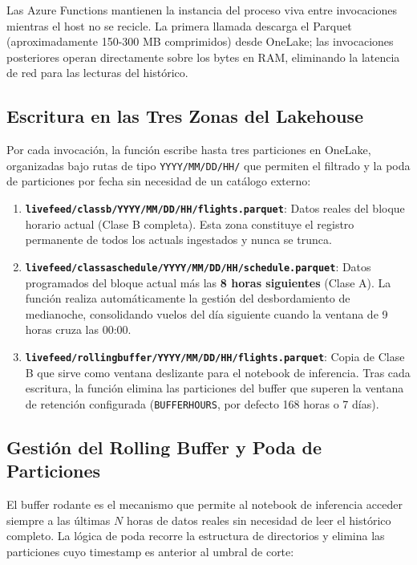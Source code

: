 \documentclass[12pt,oneside,a4paper]{report}
\renewcommand{\_}{\textunderscore\allowbreak}
\begin{document}
Las Azure Functions mantienen la instancia del proceso viva entre invocaciones mientras el host no se recicle. La primera llamada descarga el Parquet (aproximadamente 150-300 MB comprimidos) desde OneLake; las invocaciones posteriores operan directamente sobre los bytes en RAM, eliminando la latencia de red para las lecturas del histórico.

\subsection{Escritura en las Tres Zonas del Lakehouse}
\label{sub:escritura_zonas}

Por cada invocación, la función escribe hasta tres particiones en OneLake, organizadas bajo rutas de tipo \texttt{YYYY/MM/DD/HH/} que permiten el filtrado y la poda de particiones por fecha sin necesidad de un catálogo externo:

\begin{enumerate}
    \item \textbf{\texttt{live\_feed/class\_b/YYYY/MM/DD/HH/flights.parquet}}: Datos reales del bloque horario actual (Clase B completa). Esta zona constituye el registro permanente de todos los actuals ingestados y nunca se trunca.
    \item \textbf{\texttt{live\_feed/class\_a\_schedule/YYYY/MM/DD/HH/schedule.parquet}}: Datos programados del bloque actual más las \textbf{8 horas siguientes} (Clase A). La función realiza automáticamente la gestión del desbordamiento de medianoche, consolidando vuelos del día siguiente cuando la ventana de 9 horas cruza las 00:00.
    \item \textbf{\texttt{live\_feed/rolling\_buffer/YYYY/MM/DD/HH/flights.parquet}}: Copia de Clase B que sirve como ventana deslizante para el notebook de inferencia. Tras cada escritura, la función elimina las particiones del buffer que superen la ventana de retención configurada (\texttt{BUFFER\_HOURS}, por defecto 168 horas o 7 días).
\end{enumerate}

\subsection{Gestión del Rolling Buffer y Poda de Particiones}
\label{sub:poda_particiones}

El buffer rodante es el mecanismo que permite al notebook de inferencia acceder siempre a las últimas $N$ horas de datos reales sin necesidad de leer el histórico completo. La lógica de poda recorre la estructura de directorios y elimina las particiones cuyo timestamp es anterior al umbral de corte:
\end{document}
